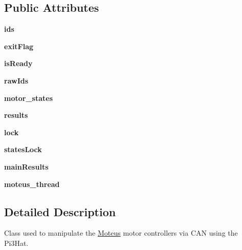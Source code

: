 \subsection*{Public Attributes}
\begin{DoxyCompactItemize}
\item 
\mbox{\label{classMoteus_1_1Moteus_af12fc974a2bb9167c6c9ea7d231c89db}} 
{\bfseries ids}
\item 
\mbox{\label{classMoteus_1_1Moteus_a42b22e76aead84473c854849ed3bee0e}} 
{\bfseries exit\+Flag}
\item 
\mbox{\label{classMoteus_1_1Moteus_a7f17efde995adf119698a4714f0bec05}} 
{\bfseries is\+Ready}
\item 
\mbox{\label{classMoteus_1_1Moteus_aea1163a7d229f8aa79b4f6c9db9a29e6}} 
{\bfseries raw\+Ids}
\item 
\mbox{\label{classMoteus_1_1Moteus_ac7e43da2bc7b1c2603047fd3490e5bc6}} 
{\bfseries motor\+\_\+states}
\item 
\mbox{\label{classMoteus_1_1Moteus_a04b495074c6bc61e4266ad54507c3954}} 
{\bfseries results}
\item 
\mbox{\label{classMoteus_1_1Moteus_a538838fb137954da520feaaea7000e87}} 
{\bfseries lock}
\item 
\mbox{\label{classMoteus_1_1Moteus_a5570b98715bc10f2c1455574c928a676}} 
{\bfseries states\+Lock}
\item 
\mbox{\label{classMoteus_1_1Moteus_a6ffa15416387e5eb8d20db582f34557d}} 
{\bfseries main\+Results}
\item 
\mbox{\label{classMoteus_1_1Moteus_a23432463cebd296f6421a5abfff369bb}} 
{\bfseries moteus\+\_\+thread}
\end{DoxyCompactItemize}


\subsection{Detailed Description}
Class used to manipulate the \hyperlink{classMoteus_1_1Moteus}{Moteus} motor controllers via C\+AN using the Pi3\+Hat. 

